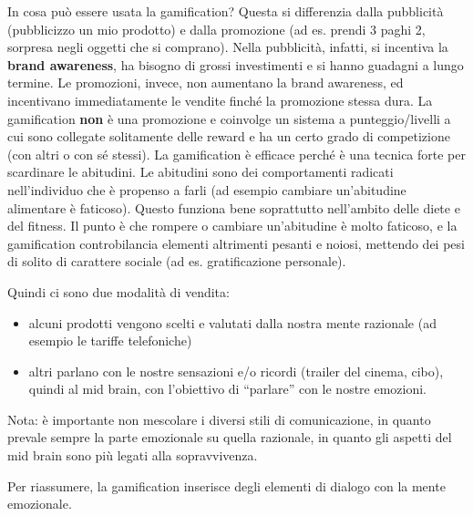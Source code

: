 In cosa può essere usata la gamification? Questa si differenzia dalla
pubblicità (pubblicizzo un mio prodotto) e dalla promozione (ad es. prendi 3
paghi 2, sorpresa negli oggetti che si comprano). Nella pubblicità, infatti, si
incentiva la \textbf{brand awareness}, ha bisogno di grossi investimenti e si
hanno guadagni a lungo termine.
Le promozioni, invece, non aumentano la brand awareness, ed incentivano
immediatamente le vendite finché la promozione stessa dura.
La gamification \textbf{non} è una promozione e coinvolge un sistema a
punteggio/livelli a cui sono collegate solitamente delle reward e ha un certo
grado di competizione (con altri o con sé stessi).
La gamification è efficace perché è una tecnica forte per scardinare le
abitudini. Le abitudini sono dei comportamenti radicati nell'individuo che è
propenso a farli (ad esempio cambiare un'abitudine alimentare è faticoso).
Questo funziona bene soprattutto nell'ambito delle diete e del fitness.
Il punto è che rompere o cambiare un'abitudine è molto faticoso, e la
gamification controbilancia elementi altrimenti pesanti e noiosi, mettendo dei
pesi di solito di carattere sociale (ad es. gratificazione personale).

Quindi ci sono due modalità di vendita:
\begin{itemize}
 \item alcuni prodotti vengono scelti e valutati dalla nostra mente razionale
(ad esempio le tariffe telefoniche)
 \item altri parlano con le nostre sensazioni e/o ricordi (trailer del cinema,
cibo), quindi al mid brain, con l'obiettivo di ``parlare'' con le nostre
emozioni.
\end{itemize}

Nota: è importante non mescolare i diversi stili di comunicazione, in quanto
prevale sempre la parte emozionale su quella razionale, in quanto gli aspetti
del mid brain sono più legati alla sopravvivenza.

Per riassumere, la gamification inserisce degli elementi di dialogo
con la mente emozionale.

